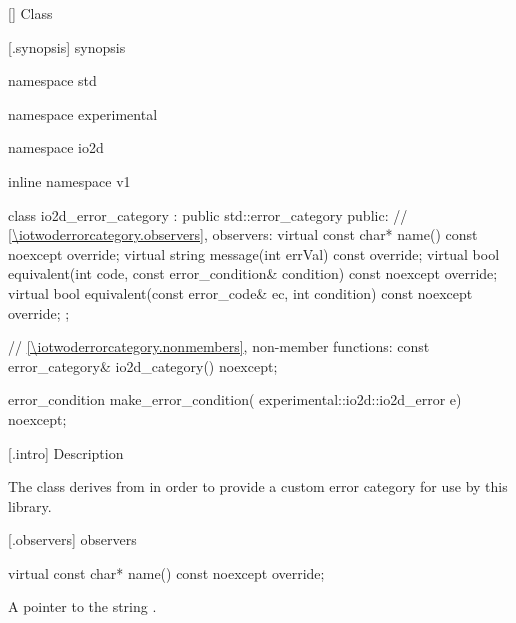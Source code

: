  [\iotwoderrorcategory] {Class }

 [\iotwoderrorcategory.synopsis] { 
synopsis}

\begin{codeblock}
namespace std { namespace experimental { namespace io2d { inline namespace v1 {
  class io2d_error_category : public std::error_category {
  public:
    // \ref{\iotwoderrorcategory.observers}, observers:
    virtual const char* name() const noexcept override;
    virtual string message(int errVal) const override;
    virtual bool equivalent(int code,
      const error_condition& condition) const noexcept override;
    virtual bool equivalent(const error_code& ec,
      int condition) const noexcept override;
  };
  
  // \ref{\iotwoderrorcategory.nonmembers}, non-member functions:
  const error_category& io2d_category() noexcept;
} } }

  error_condition make_error_condition(
    experimental::io2d::io2d_error e) noexcept;
}
\end{codeblock}

 [\iotwoderrorcategory.intro] { 
Description}

\pnum
{}
The  class derives from 
 in order to provide a custom error category for 
use by this library.

 [\iotwoderrorcategory.observers] { 
observers}

\begin{itemdecl}
virtual const char* name() const noexcept override;
\end{itemdecl}
\begin{itemdescr}
	\pnum
	\returns
	A pointer to the string .
\end{itemdescr}

